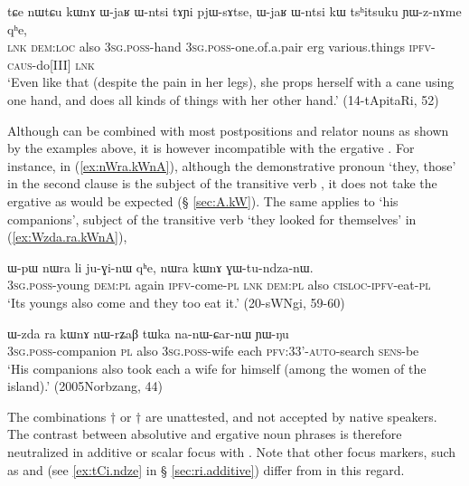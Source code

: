     \begin{exe}
\ex \label{ex:nWtCu.kWnA2}
\gll    tɕe nɯtɕu kɯnɤ ɯ-jaʁ ɯ-ntsi tɤɲi pjɯ-sɤtse, ɯ-jaʁ ɯ-ntsi kɯ tsʰitsuku ɲɯ-z-nɤme qʰe, \\
\textsc{lnk} \textsc{dem}:\textsc{loc} also \textsc{3sg}.\textsc{poss}-hand \textsc{3sg}.\textsc{poss}-one.of.a.pair erg various.things \textsc{ipfv}-\textsc{caus}-do[III] \textsc{lnk}  \\
\glt `Even like that (despite the pain in her legs), she props herself with a cane using one hand, and does all kinds of things with her other hand.' (14-tApitaRi, 52)
\end{exe}

Although  can be combined with most postpositions and relator nouns as shown by the examples above, it is however incompatible with the ergative . For instance, in  (\ref{ex:nWra.kWnA}), although the demonstrative pronoun  `they, those' in the second clause is the subject of the transitive verb , it does not take the ergative  as would be expected (§ \ref{sec:A.kW}). The same applies to  `his companions', subject of the transitive verb  `they looked for themselves' in (\ref{ex:Wzda.ra.kWnA}), 

  \begin{exe}
\ex \label{ex:nWra.kWnA}
\gll ɯ-pɯ nɯra li ju-ɣi-nɯ qʰe, nɯra kɯnɤ ɣɯ-tu-ndza-nɯ. \\
\textsc{3sg}.\textsc{poss}-young \textsc{dem}:\textsc{pl} again \textsc{ipfv}-come-\textsc{pl} \textsc{lnk} \textsc{dem}:\textsc{pl} also \textsc{cisloc}-\textsc{ipfv}-eat-\textsc{pl} \\
\glt `Its youngs also come and they too eat it.' (20-sWNgi, 59-60)
  \end{exe}
  
    \begin{exe}
\ex \label{ex:Wzda.ra.kWnA}
\gll   ɯ-zda ra kɯnɤ nɯ-rʑaβ tɯka na-nɯ-ɕar-nɯ ɲɯ-ŋu \\
\textsc{3sg}.\textsc{poss}-companion \textsc{pl} also \textsc{3sg}.\textsc{poss}-wife each \textsc{pfv}:3\fl{}3'-\textsc{auto}-search \textsc{sens}-be \\
\glt `His companions also took each a wife for himself (among the women of the island).' (2005Norbzang, 44)
    \end{exe}
    
The combinations $\dagger$ or $\dagger$ are unattested, and not accepted by native speakers. The contrast between absolutive and ergative noun phrases is therefore neutralized in additive or scalar focus with . Note that other focus markers, such as  and  (see \ref{ex:tCi.ndze} in § \ref{sec:ri.additive}) differ from  in this regard.

